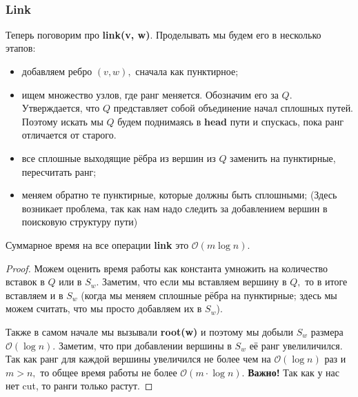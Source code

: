 $\quad$

\subsubsection{Link}
Теперь поговорим про \textbf{link(v, w)}. Проделывать мы будем его в несколько этапов:
\begin{itemize}
    \item добавляем ребро $(v, w),$ сначала как пунктирное;
    \item ищем множество узлов, где ранг меняется. Обозначим его за $Q.$ Утверждается, что $Q$ представляет собой объединение начал сплошных путей. Поэтому искать мы $Q$ будем поднимаясь в \textbf{head} пути и спускась, пока ранг отличается от старого.
    \item все сплошные выходящие рёбра из вершин из $Q$ заменить на пунктирные, пересчитать ранг;
    \item меняем обратно те пунктирные, которые должны быть сплошными; (Здесь возникает проблема, так как нам надо следить за добавлением вершин в поисковую структуру пути)
\end{itemize}
\begin{lemma}
Суммарное время на все операции \textbf{link} это $\mathcal{O}(m\log{n}).$
\end{lemma}
\begin{proof}
Можем оценить время работы как константа умножить на количество вставок в $Q$ или в $S_w.$ Заметим, что если мы вставляем вершину в $Q,$ то в итоге вставляем и в $S_w$ (когда мы меняем сплошные рёбра на пунктирные; здесь мы можем считать, что мы просто добавляем их в $S_w$). 

Также в самом начале мы вызывали \textbf{root(w)} и поэтому мы добыли $S_w$ размера $\mathcal{O}(\log{n}).$ Заметим, что при добавлении вершины в $S_w$ её ранг увелиличился. Так как ранг для каждой вершины увеличился не более чем на $\mathcal{O}(\log{n})$ раз и $m > n,$ то общее время работы не более $\mathcal{O}(m\cdot\log{n}).$ \textbf{Важно!} Так как у нас нет cut, то ранги только растут.
\end{proof}
